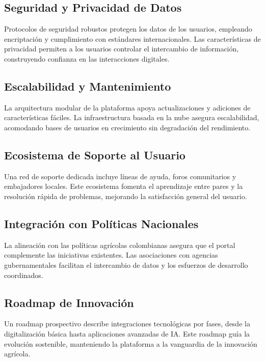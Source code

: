 \subsection{Seguridad y Privacidad de Datos}
Protocolos de seguridad robustos protegen los datos de los usuarios, empleando encriptación y cumplimiento con estándares internacionales. Las características de privacidad permiten a los usuarios controlar el intercambio de información, construyendo confianza en las interacciones digitales.

\subsection{Escalabilidad y Mantenimiento}
La arquitectura modular de la plataforma apoya actualizaciones y adiciones de características fáciles. La infraestructura basada en la nube asegura escalabilidad, acomodando bases de usuarios en crecimiento sin degradación del rendimiento.

\subsection{Ecosistema de Soporte al Usuario}
Una red de soporte dedicada incluye líneas de ayuda, foros comunitarios y embajadores locales. Este ecosistema fomenta el aprendizaje entre pares y la resolución rápida de problemas, mejorando la satisfacción general del usuario.

\subsection{Integración con Políticas Nacionales}
La alineación con las políticas agrícolas colombianas asegura que el portal complemente las iniciativas existentes. Las asociaciones con agencias gubernamentales facilitan el intercambio de datos y los esfuerzos de desarrollo coordinados.

\subsection{Roadmap de Innovación}
Un roadmap prospectivo describe integraciones tecnológicas por fases, desde la digitalización básica hasta aplicaciones avanzadas de IA. Este roadmap guía la evolución sostenible, manteniendo la plataforma a la vanguardia de la innovación agrícola.